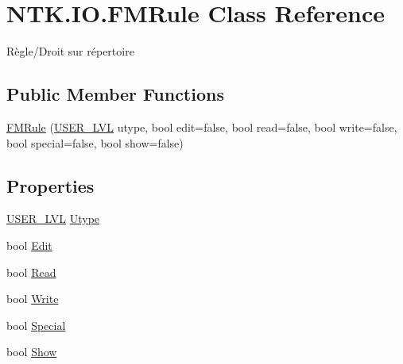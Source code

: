 \hypertarget{class_n_t_k_1_1_i_o_1_1_f_m_rule}{}\section{N\+T\+K.\+I\+O.\+F\+M\+Rule Class Reference}
\label{class_n_t_k_1_1_i_o_1_1_f_m_rule}


Règle/\+Droit sur répertoire  


\subsection*{Public Member Functions}
\begin{DoxyCompactItemize}
\item 
\mbox{\hyperlink{class_n_t_k_1_1_i_o_1_1_f_m_rule_ac65bf762f43544a8ae5c9f7782a220b7}{F\+M\+Rule}} (\mbox{\hyperlink{namespace_n_t_k_a1a2136a0cde3a719c9188a4d515e9f1b}{U\+S\+E\+R\+\_\+\+L\+VL}} utype, bool edit=false, bool read=false, bool write=false, bool special=false, bool show=false)
\end{DoxyCompactItemize}
\subsection*{Properties}
\begin{DoxyCompactItemize}
\item 
\mbox{\hyperlink{namespace_n_t_k_a1a2136a0cde3a719c9188a4d515e9f1b}{U\+S\+E\+R\+\_\+\+L\+VL}} \mbox{\hyperlink{class_n_t_k_1_1_i_o_1_1_f_m_rule_a0fa8d3b14f204100d4c95bd0a066c73a}{Utype}}
\item 
bool \mbox{\hyperlink{class_n_t_k_1_1_i_o_1_1_f_m_rule_a7b01134ca9c95fbf9e8dc0324258af9f}{Edit}}
\item 
bool \mbox{\hyperlink{class_n_t_k_1_1_i_o_1_1_f_m_rule_aabe3c933c39723b3c406de7ee9ef511f}{Read}}
\item 
bool \mbox{\hyperlink{class_n_t_k_1_1_i_o_1_1_f_m_rule_a8f2b681b7442c2d5f42553f40d4cf3c4}{Write}}
\item 
bool \mbox{\hyperlink{class_n_t_k_1_1_i_o_1_1_f_m_rule_aceba236c38afac3541a875c169efc0f4}{Special}}
\item 
bool \mbox{\hyperlink{class_n_t_k_1_1_i_o_1_1_f_m_rule_a282cb9c7771fff37334a16de52410d4c}{Show}}
\end{DoxyCompactItemize}


